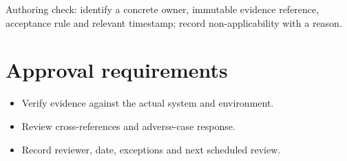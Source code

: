 \documentclass[10pt,letterpaper]{article}
\begin{document}
Authoring check: identify a concrete owner, immutable evidence reference, acceptance rule and relevant timestamp; record non-applicability with a reason.


\section{Approval requirements}
\begin{itemize}
\item Verify evidence against the actual system and environment.
\item Review cross-references and adverse-case response.
\item Record reviewer, date, exceptions and next scheduled review.
\end{itemize}
\end{document}
